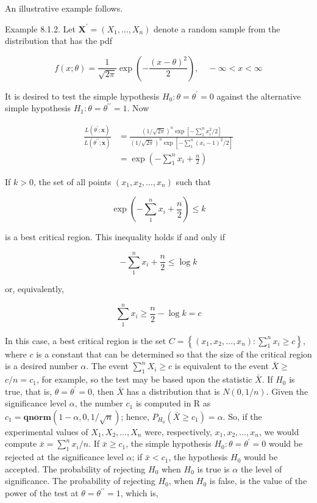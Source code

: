 An illustrative example follows.

Example 8.1.2. Let $\mathbf{X}^{\prime}=\left(X_{1}, \ldots, X_{n}\right)$ denote a random sample from the distribution that has the pdf

$$
f(x ; \theta)=\frac{1}{\sqrt{2 \pi}} \exp \left(-\frac{(x-\theta)^{2}}{2}\right), \quad-\infty<x<\infty
$$

It is desired to test the simple hypothesis $H_{0}: \theta=\theta^{\prime}=0$ against the alternative simple hypothesis $H_{1}: \theta=\theta^{\prime \prime}=1$. Now

$$
\begin{aligned}
\frac{L\left(\theta^{\prime} ; \mathbf{x}\right)}{L\left(\theta^{\prime \prime} ; \mathbf{x}\right)} & =\frac{(1 / \sqrt{2 \pi})^{n} \exp \left[-\sum_{1}^{n} x_{i}^{2} / 2\right]}{(1 / \sqrt{2 \pi})^{n} \exp \left[-\sum_{1}^{n}\left(x_{i}-1\right)^{2} / 2\right]} \\
& =\exp \left(-\sum_{1}^{n} x_{i}+\frac{n}{2}\right)
\end{aligned}
$$

If $k>0$, the set of all points $\left(x_{1}, x_{2}, \ldots, x_{n}\right)$ such that

$$
\exp \left(-\sum_{1}^{n} x_{i}+\frac{n}{2}\right) \leq k
$$

is a best critical region. This inequality holds if and only if

$$
-\sum_{1}^{n} x_{i}+\frac{n}{2} \leq \log k
$$

or, equivalently,

$$
\sum_{1}^{n} x_{i} \geq \frac{n}{2}-\log k=c
$$

In this case, a best critical region is the set $C=\left\{\left(x_{1}, x_{2}, \ldots, x_{n}\right): \sum_{1}^{n} x_{i} \geq c\right\}$, where $c$ is a constant that can be determined so that the size of the critical region is a desired number $\alpha$. The event $\sum_{1}^{n} X_{i} \geq c$ is equivalent to the event $\bar{X} \geq$ $c / n=c_{1}$, for example, so the test may be based upon the statistic $\bar{X}$. If $H_{0}$ is true, that is, $\theta=\theta^{\prime}=0$, then $\bar{X}$ has a distribution that is $N(0,1 / n)$. Given the significance level $\alpha$, the number $c_{1}$ is computed in R as $c_{1}=\mathbf{q n o r m}(1-\alpha, 0,1 / \sqrt{n})$; hence, $P_{H_{0}}\left(\bar{X} \geq c_{1}\right)=\alpha$. So, if the experimental values of $X_{1}, X_{2}, \ldots, X_{n}$ were, respectively, $x_{1}, x_{2}, \ldots, x_{n}$, we would compute $\bar{x}=\sum_{1}^{n} x_{i} / n$. If $\bar{x} \geq c_{1}$, the simple hypothesis $H_{0}: \theta=\theta^{\prime}=0$ would be rejected at the significance level $\alpha$; if $\bar{x}<c_{1}$, the hypothesis $H_{0}$ would be accepted. The probability of rejecting $H_{0}$ when $H_{0}$ is true is $\alpha$ the level of significance. The probability of rejecting $H_{0}$, when $H_{0}$ is false, is the value of the power of the test at $\theta=\theta^{\prime \prime}=1$, which is,


